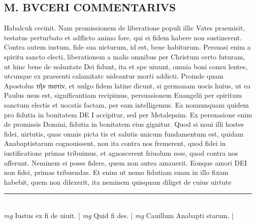 \documentclass{article}
\begin{document}
\begin{pages}
\section*{M. BVCERI COMMENTARIVS }
\marginpar{[ p.20 ]}\pstart Habalcuk cecinit.  Nam promissionem de liberatione populi illic Vates praemisit, testatus perturbato et adflicto animo fore, qui ei fidem habere non sustinerent. Contra autem iustum, fide sua uicturum, id est, bene habiturum.  Persuasi enim a spiritu sancto electi, liberationem a malis omnibus per Christum certo futuram, ut hinc bene de uoluntate Dei fidunt, ita et spe uiuunt, omnia boni consu lentes, utcunque ex praesenti calamitatc uideantur morti addicti.   \pend\pstart Proinde quam Apostolus τῆν πιστὶν, et uulgo fidem latine dicunt, si germanam uocis huius, ut ea Paulus usus est, significantiam recipimus, persuasionem Euangelii per spiritum sanctum electis et uocatis factam, per eam intelligemus. Ea nonnunquam quidem pro fidutia in bonitatem DE I accipitur, sed per Metalepsim.  Ex persuasione enim de promissis Domini, fidutia in bonitatem eius gignitur.  \pend\pstart Quod si noui illi hostes fidei, uirtutis, quae omnis picta tis et salutis unicum fundamentum est, quidam Anabaptistarum cognouissent, non ita contra nos fremerent, quod  fidei in iustificationc primas tribuimus, et agnoscerent friuolum esse, quod contra nos afferunt.  Neminem ei posse fidere, quem non antea amauerit.  Eonque amori DEI non fidei, primas tribuendas.  Et enim ut nemo fidutiam suam in illo fixam habebit, quem non dilexerit, ita neminem quisquam diliget de cuius uirtute  \pend
\vspace{0.5cm}\noindent
\vspace{0.2cm}\rule{1cm}{0.2pt}\\ 
\hspace{0.2cm}\textit{mg}
\footnotesize Iustus ex fi de uiuit.  
\normalsize| 
\hspace{0.2cm}\textit{mg}
\footnotesize Quid fi des.  
\normalsize| 
\hspace{0.2cm}\textit{mg}
\footnotesize Cauillum Anabapti starum.  
\normalsize| 

\end{pages}
\end{document}
